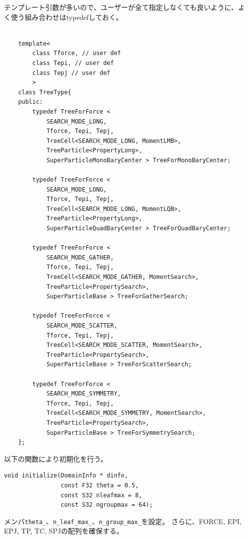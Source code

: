 テンプレート引数が多いので、ユーザーが全て指定しなくても良いように、よ
く使う組み合わせはtypedefしておく。

\begin{lstlisting}[caption=相互作用ツリークラス]

    template<
        class Tforce, // user def
        class Tepi, // user def
        class Tepj // user def
        >
    class TreeType{
    public:
        typedef TreeForForce <
            SEARCH_MODE_LONG,
            Tforce, Tepi, Tepj,
            TreeCell<SEARCH_MODE_LONG, MomentLMB>,
            TreeParticle<PropertyLong>,
            SuperParticleMonoBaryCenter > TreeForMonoBaryCenter;

        typedef TreeForForce <
            SEARCH_MODE_LONG,
            Tforce, Tepi, Tepj,
            TreeCell<SEARCH_MODE_LONG, MomentLQB>,
            TreeParticle<PropertyLong>,
            SuperParticleQuadBaryCenter > TreeForQuadBaryCenter;

        typedef TreeForForce <
            SEARCH_MODE_GATHER,
            Tforce, Tepi, Tepj,
            TreeCell<SEARCH_MODE_GATHER, MomentSearch>,
            TreeParticle<PropertySearch>,
            SuperParticleBase > TreeForGatherSearch;

        typedef TreeForForce <
            SEARCH_MODE_SCATTER,
            Tforce, Tepi, Tepj,
            TreeCell<SEARCH_MODE_SCATTER, MomentSearch>,
            TreeParticle<PropertySearch>,
            SuperParticleBase > TreeForScatterSearch;

        typedef TreeForForce <
            SEARCH_MODE_SYMMETRY,
            Tforce, Tepi, Tepj,
            TreeCell<SEARCH_MODE_SYMMETRY, MomentSearch>,
            TreeParticle<PropertySearch>,
            SuperParticleBase > TreeForSymmetrySearch;
    };

\end{lstlisting}
\fi



以下の関数により初期化を行う。

\begin{screen}
\begin{verbatim}
void initialize(DomainInfo * dinfo,
                const F32 theta = 0.5,
                const S32 nleafmax = 8,
                const S32 ngroupmax = 64);
\end{verbatim}
\end{screen}

メンバ{\tt theta\_}、{\tt n\_leaf\_max\_}、{\tt n\_group\_max\_}を設定。
さらに、FORCE, EPI, EPJ, TP, TC, SPJの配列を確保する。

